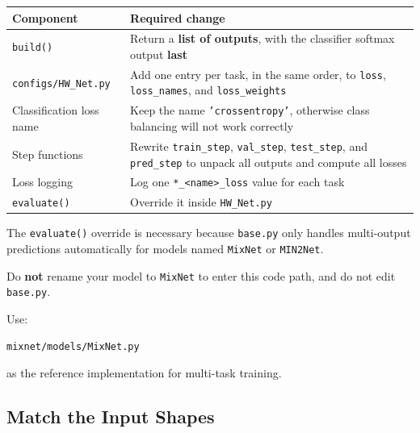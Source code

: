 \documentclass[
  10pt,
]{article}
\newcounter{none} %
\begin{document}
{\def\LTcaptype{none} %
\begin{longtable}[]{@{}
  >{\raggedright\arraybackslash}p{}
  >{\raggedright\arraybackslash}p{}@{}}
\toprule\noalign{}
\begin{minipage}[b]{\linewidth}\raggedright
Component
\end{minipage} & \begin{minipage}[b]{\linewidth}\raggedright
Required change
\end{minipage} \\
\midrule\noalign{}
\endhead
\bottomrule\noalign{}
\endlastfoot
\texttt{build()} & Return a \textbf{list of outputs}, with the
classifier softmax output \textbf{last} \\
\texttt{configs/HW\_Net.py} & Add one entry per task, in the same
order, to \texttt{loss}, \texttt{loss\_names}, and
\texttt{loss\_weights} \\
Classification loss name & Keep the name \texttt{'crossentropy'},
otherwise class balancing will not work correctly \\
Step functions & Rewrite \texttt{train\_step}, \texttt{val\_step},
\texttt{test\_step}, and \texttt{pred\_step} to unpack all outputs and
compute all losses \\
Loss logging & Log one \texttt{*\_\textless{}name\textgreater{}\_loss}
value for each task \\
\texttt{evaluate()} & Override it inside \texttt{HW\_Net.py} \\
\end{longtable}
}

The \texttt{evaluate()} override is necessary because \texttt{base.py}
only handles multi-output predictions automatically for models named
\texttt{MixNet} or \texttt{MIN2Net}.

Do \textbf{not} rename your model to \texttt{MixNet} to enter this
code path, and do not edit \texttt{base.py}.

Use:

\begin{verbatim}
mixnet/models/MixNet.py
\end{verbatim}

as the reference implementation for multi-task training.

\subsection{Match the Input Shapes}\label{match-the-input-shapes}
\end{document}
